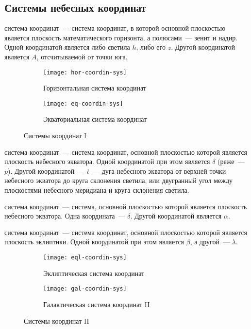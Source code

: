 \subsection{Системы небесных координат}
 система координат~--- система координат, в которой основной плоскостью является плоскость математического горизонта, а полюсами~--- зенит и надир. Одной координатой является либо  светила $h$, либо его  $z$. Другой координатой является  $A$, отсчитываемой от точки юга.


\begin{figure}[!h]
\centering
	\begin{subfigure}{0.49\textwidth}
		\texttt{[image: hor-coordin-sys]}
		\caption{Горизонтальная система координат}
	 \end{subfigure}
	 \hfill
	\begin{subfigure}{0.49\textwidth}
		\texttt{[image: eq-coordin-sys]}
		\caption{Экваториальная система координат}
	 \end{subfigure}
	\caption{Системы координат I}
\end{figure}

 система координат~--- система координат, основной плоскостью которой является плоскость небесного экватора. Одной координатой при этом является  $\delta$ (реже~---  $p$). Другой координатой~---  $t$~--- дуга небесного экватора от верхней точки небесного экватора до круга склонения светила, или двугранный угол между плоскостями небесного меридиана и круга склонения светила.

 система координат~--- система, основной плоскостью которой является плоскость небесного экватора. Одна координата~---  $\delta$. Другой координатой является  $\alpha$.


 система координат~--- система координат, основной плоскостью которой является плоскость эклиптики. Одной координатой при этом является  $\beta$, а другой~---  $\lambda$.

\begin{figure}[!h]

\centering
	\begin{subfigure}{0.49\textwidth}
		\texttt{[image: eql-coordin-sys]}
		\caption{Эклиптическая система координат}
	 \end{subfigure}
	 \hfill
	\begin{subfigure}{0.49\textwidth}
		\texttt{[image: gal-coordin-sys]}
		\caption{Галактическая система координат II}
	 \end{subfigure}
	\caption{Системы координат II}
\end{figure}

